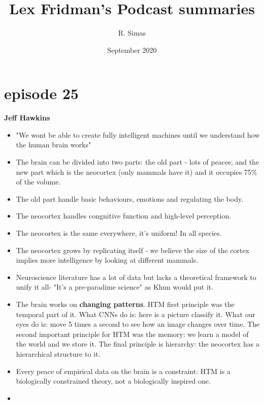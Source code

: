 \documentclass{article}
\title{Lex Fridman's Podcast summaries}
\author{R. Simas }
\date{September 2020}
\begin{document}
\maketitle
\section{episode 25}
\textbf{Jeff Hawkins}\newline
\begin{itemize}
\item "We wont be able to create fully intelligent machines until we understand how the human brain works"
\item The brain can be divided into two parts: the old part - lots of peaces; and the new part which is the neocortex (only mammals have it) and it occupies 75\% of the volume.
\item The old part handle basic behaviours, emotions and regulating the body.
\item The neocortex handles congnitive function and high-level perception. 
\item The neocortex is the same everywhere, it's uniform! In all species.
\item The neocortex grows by replicating itself - we believe the size of the cortex implies more intelligence by looking at different mammals.
\item Neuroscience literature has a lot of data but lacks a theoretical framework to unify it all- "It's a pre-paradime science"  as Khun would put it.
\item The brain works on \textbf{changing patterns}. HTM first principle was the temporal part of it. What CNNs do is: here is a picture classify it. What our eyes do is: move 5 times a second to see how an image changes over time. The second important principle for HTM was the memory: we learn a model of the world and we store it. The final principle is hierarchy: the neocortex has a hierarchical structure to it.
\item Every peace of empirical data on the brain is a constraint: HTM is a biologically constrained theory, not a biologically inspired one.
\item 
\end{itemize}

 

\end{document}
